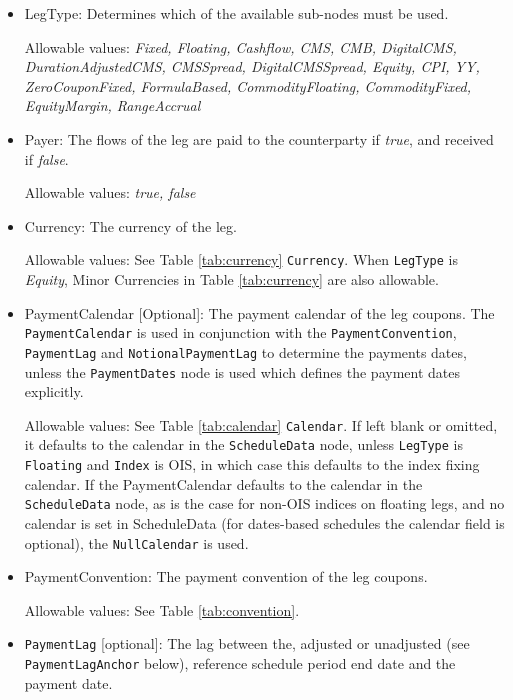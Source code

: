 \begin{itemize}
\item LegType:  Determines which of the available sub-nodes must be
  used. 

Allowable values:  \emph{Fixed, Floating, Cashflow, CMS, CMB, DigitalCMS, DurationAdjustedCMS, CMSSpread, DigitalCMSSpread, Equity, CPI, YY, ZeroCouponFixed, FormulaBased, CommodityFloating, CommodityFixed, EquityMargin, RangeAccrual} 

\item Payer:  The flows of the leg are paid to the counterparty if
  \emph{true}, and received if \emph{false}.  

Allowable values:  \emph{true, false} 

\item Currency: The currency of the leg. 

Allowable values:  See Table \ref{tab:currency} \lstinline!Currency!. When \lstinline!LegType! is \emph{Equity}, Minor Currencies in Table \ref{tab:currency} are also allowable.

\item PaymentCalendar [Optional]: The payment calendar of the leg coupons. The \lstinline!PaymentCalendar! is used in conjunction with the \lstinline!PaymentConvention!, \lstinline!PaymentLag! and \lstinline!NotionalPaymentLag! to determine the payments dates, unless the \lstinline!PaymentDates! node is used which defines the payment dates explicitly.

Allowable values: See Table \ref{tab:calendar} \lstinline!Calendar!.
If left blank or omitted, it defaults to the calendar in the \lstinline!ScheduleData! node,
unless \lstinline!LegType! is \lstinline!Floating! and \lstinline!Index! is OIS,
in which case this defaults to the index fixing calendar.
If the PaymentCalendar defaults to the calendar in the \lstinline!ScheduleData! node, 
as is the case for non-OIS indices on floating legs, and no calendar is set in ScheduleData 
(for dates-based schedules the calendar field is optional), the \lstinline!NullCalendar! is used.

\item PaymentConvention: The payment convention of the leg coupons. 

Allowable values: See Table \ref{tab:convention}.

\item \lstinline!PaymentLag! [optional]:
The lag between the, adjusted or unadjusted (see \lstinline!PaymentLagAnchor! below), reference schedule period end 
date and the payment date.


\end{itemize}
